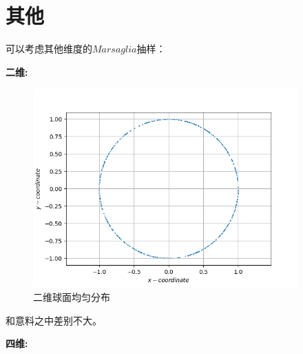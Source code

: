 \documentclass[UTF8]{ctexart}
\begin{document}
	\section{其他}
	
\begin{flushleft}
		可以考虑其他维度的$Marsaglia$抽样：
\end{flushleft}
\begin{flushleft}
	\textbf{	二维:}
\end{flushleft}
		\begin{figure}[H]
			\centering\includegraphics[width=4in]{../2-xy}
			\caption{二维球面均匀分布}
		\end{figure}
\begin{flushleft}
		和意料之中差别不大。
\end{flushleft}
	\clearpage
\begin{flushleft}
		\textbf{四维:}
\end{flushleft}
\end{document}
